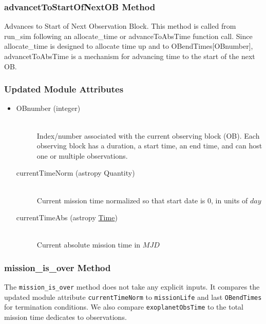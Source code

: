 \documentclass[cleanfoot]{asme2ej}
\begin{document}
\subsubsection{advancetToStartOfNextOB Method} \label{sec:advancetToStartOfNextOBtask}
Advances to Start of Next Observation Block. This method is called from run\_sim following an allocate\_time or advanceToAbsTime function call. Since allocate\_time is designed to allocate time up and to OBendTimes[OBnumber], advancetToAbsTime is a mechanism for advancing time to the start of the next OB.
\subsubsection*{Updated Module Attributes}
\begin{itemize}
\item 
\begin{description}
    \item[OBnumber (integer)] \hfill \\ Index/number associated with the current observing block (OB). Each observing block has a duration, a start time, an end time, and can host one or multiple observations.
    \item[currentTimeNorm (astropy Quantity)] \hfill \\ Current mission time normalized so that start date is 0, in units of $ day $
    \item[currentTimeAbs (astropy \href{http://astropy.readthedocs.org/en/latest/time/index.html}{Time})] \hfill \\ Current absolute mission time in $ MJD $
\end{description}
\end{itemize}

\subsubsection{mission\_is\_over Method} \label{sec:missionisovertask}
The \verb+mission_is_over+ method does not take any explicit inputs.  It compares the updated module attribute \verb+currentTimeNorm+ to \verb+missionLife+ and last \verb+OBendTimes+ for termination conditions. We also compare \verb+exoplanetObsTime+ to the total mission time dedicates to observations.
\end{document}
